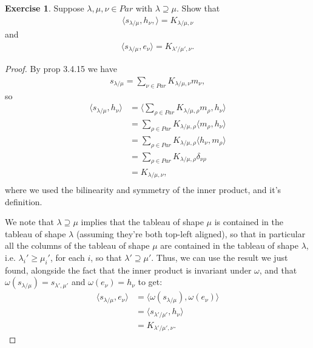 \documentclass[12pt]{extarticle}
\newcommand{\<}{\langle}
\renewcommand{\>}{\rangle}
\theoremstyle{definition}
\newtheorem{exercise}{Exercise}
\begin{document}
\begin{exercise}
  Suppose $\lambda, \mu, \nu \in Par$ with $\lambda \supseteq \mu$. Show that
  \begin{align*}
    \< s_{\lambda / \mu}, h_{\nu}, \> = K_{\lambda/\mu, \nu}
  \end{align*}
  and
  \begin{align*}
    \< s_{\lambda / \mu}, e_{\nu} \> = K_{\lambda' / \mu', \nu}.
  \end{align*}
\end{exercise}
\begin{proof}
  By prop 3.4.15 we have
  \begin{align*}
    s_{\lambda/\mu} = \sum\limits_{\nu \in Par} K_{\lambda/\mu, \nu} m_{\nu},
  \end{align*}
  so
  \begin{align*}
    \< s_{\lambda / \mu}, h_{\nu} \>
    &= \< \sum\limits_{\rho \in Par} K_{\lambda/\mu, \rho} m_{\rho} , h_{\nu} \> \\
    &= \sum\limits_{\rho \in Par} K_{\lambda/\mu, \rho} \< m_{\rho} , h_{\nu} \> \\
    &= \sum\limits_{\rho \in Par} K_{\lambda/\mu, \rho} \< h_{\nu},  m_{\rho} \> \\
    &= \sum\limits_{\rho \in Par} K_{\lambda/\mu, \rho} \delta_{\nu \rho} \\
    &= K_{\lambda/\mu, \nu}, \\    
  \end{align*}
  where we used the bilinearity and symmetry of the inner product, and it's definition.

  We note that $\lambda \supseteq \mu$ implies that the tableau of shape $\mu$ is contained in the tableau of shape $\lambda$ (assuming they're both top-left aligned), so that in particular all the columns of the tableau of shape $\mu$ are contained in the tableau of shape $\lambda$,
  i.e. $\lambda_i' \geq \mu_i'$, for each $i$, so that $\lambda' \supseteq \mu'$. Thus, we can use the result we just found, alongside the fact that the inner product is invariant under $\omega$,
  and that $\omega(s_{\lambda/\mu}) = s_{\lambda',\mu'}$ and $\omega(e_{\nu}) = h_{\nu}$ to get: 
  \begin{align*}
    \< s_{\lambda / \mu}, e_{\nu} \>
    &= \< \omega(s_{\lambda / \mu}), \omega(e_{\nu}) \> \\
    &= \< s_{\lambda' / \mu'}, h_{\nu} \> \\
    &= K_{\lambda' / \mu', \nu}.
  \end{align*}

\end{proof}
\end{document}
